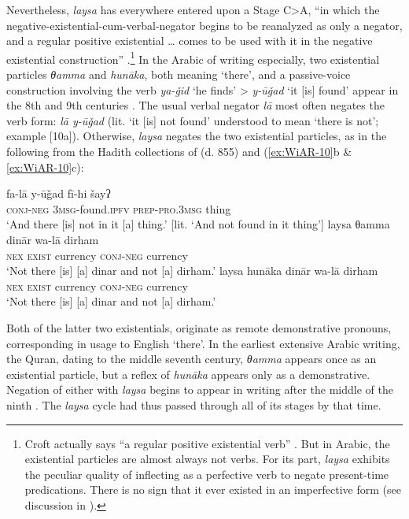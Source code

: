 \documentclass[output=paper]{langsci/langscibook}
\begin{document}
Nevertheless, \textit{laysa} has everywhere entered upon a Stage C>A, “in which the negative-existential-cum-verbal-negator begins to be reanalyzed as only a negator, and a regular positive existential … comes to be used with it in the negative existential construction” \citep[12]{Croft1991}.\footnote{Croft actually says “a regular positive existential verb” \citep[12]{Croft1991}. But in Arabic, the existential particles are almost always not verbs. For its part, \textit{laysa} exhibits the peculiar quality of inflecting as a perfective verb to negate present-time predications. There is no sign that it ever existed in an imperfective form (see discussion in \citealt[341--346]{wilmsen2016a}).} In the Arabic of writing especially, two existential particles \textit{θamma} and \textit{hunāka}, both meaning ‘there’, and a passive-voice construction involving the verb \textit{ya-ǧid} ‘he finds’ > \textit{y-ūǧad} ‘it [is] found’ appear in the 8th and 9th centuries \citep[354–356]{wilmsen2016a}. The usual verbal negator \textit{lā} most often negates the verb form: \textit{lā y-ūǧad} (lit. ‘it [is] not found’ understood to mean ‘there is not’; example [10a]). Otherwise, \textit{laysa} negates the two existential particles, as in the following from the Hadith collections of \citeauthor{anbal-a} (d. 855) and \citeauthor{al-bu2000a} (\ref{ex:WiAR-10}b \& \ref{ex:WiAR-10}c):

\ea \label{ex:WiAR-10}
  \ea
  	\gll fa-lā y-ūǧad fī-hi šayʔ\\
  	\textsc{conj-neg} \textsc{3msg}-found.\textsc{ipfv}	\textsc{prep-pro.3msg} thing\\
  	\glt ‘And there [is] not in it [a] thing.’ [lit. ‘And not found in it thing’] \citep[Vol. VIII p. 1256]{al-bu2000a}
  \ex
  	\gll laysa θamma dinār wa-lā dirham \\
  	\textsc{nex} \textsc{exist} currency \textsc{conj-neg} currency \\
    \glt ‘Not there [is] [a] dinar and not [a] dirham.' \citep[Vol. VIII p. 1323]{al-bu2000a}
  \ex
  	\gll laysa hunāka dinār wa-lā dirham \\
  	\textsc{nex} \textsc{exist} currency \textsc{conj-neg} currency\\
  	\glt ‘Not there [is] [a] dinar and not [a] dirham.’ \citep[Vol. IX, p. 507]{anbal-a}
\z \z

Both of the latter two existentials, originate as remote demonstrative pronouns, corresponding in usage to English ‘there’. In the earliest extensive Arabic writing, the Quran, dating to the middle seventh century, \textit{θamma} appears once as an existential particle, but a reflex of \textit{hunāka} appears only as a demonstrative. Negation of either with \textit{laysa} begins to appear in writing after the middle of the ninth \citep[354--355]{wilmsen2016a}. The \textit{laysa} cycle had thus passed through all of its stages by that time.
\end{document}
